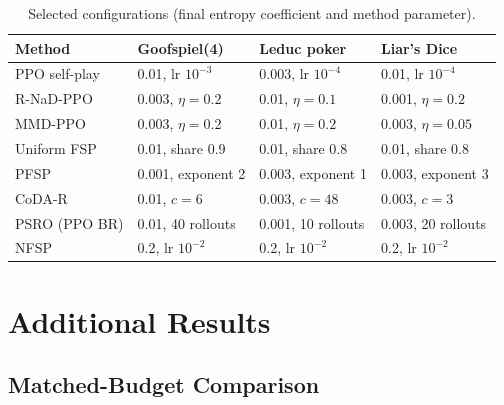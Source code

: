 \documentclass{article}
\theoremstyle{plain}
\theoremstyle{remark}
\newcommand{\codar}{CoDA-R}
\newcommand{\rnad}{R-NaD-PPO}
\begin{document}
\begin{table}[!htbp]
\caption{Selected configurations (final entropy coefficient and method parameter).}
\label{tab:tuning}
\begin{center}
\footnotesize
\begin{tabular}{llll}
\toprule
Method & Goofspiel(4) & Leduc poker & Liar's Dice \\
\midrule
PPO self-play & 0.01, lr $10^{-3}$ & 0.003, lr $10^{-4}$ & 0.01, lr $10^{-4}$ \\
\rnad{} & 0.003, $\eta=0.2$ & 0.01, $\eta=0.1$ & 0.001, $\eta=0.2$ \\
MMD-PPO & 0.003, $\eta=0.2$ & 0.01, $\eta=0.2$ & 0.003, $\eta=0.05$ \\
Uniform FSP & 0.01, share 0.9 & 0.01, share 0.8 & 0.01, share 0.8 \\
PFSP & 0.001, exponent 2 & 0.003, exponent 1 & 0.003, exponent 3 \\
\codar{} & 0.01, $c=6$ & 0.003, $c=48$ & 0.003, $c=3$ \\
PSRO (PPO BR) & 0.01, 40 rollouts & 0.001, 10 rollouts & 0.003, 20 rollouts \\
NFSP & 0.2, lr $10^{-2}$ & 0.2, lr $10^{-2}$ & 0.2, lr $10^{-2}$ \\
\bottomrule
\end{tabular}
\end{center}
\end{table}

\FloatBarrier
\section{Additional Results}
\label{app:extra}

\subsection{Matched-Budget Comparison}
\end{document}
